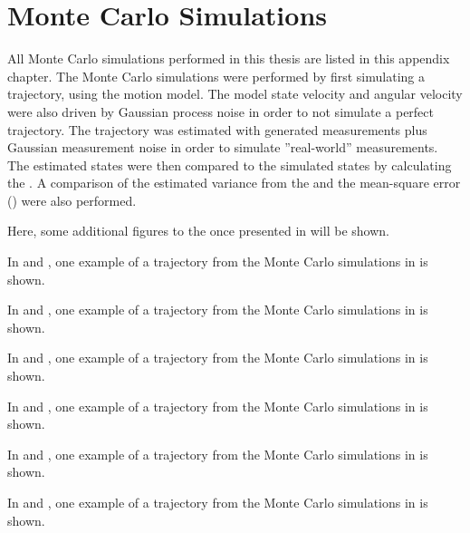 \chapter{Monte Carlo Simulations}
\label{app:montecarlo}

All Monte Carlo simulations performed in this thesis are listed in this appendix chapter.
The Monte Carlo simulations were performed by first simulating a trajectory, using the motion model.
The model state velocity and angular velocity were also driven by Gaussian process noise in order to not simulate a perfect trajectory.
The trajectory was estimated with generated measurements plus Gaussian measurement noise in order to simulate ''real-world'' measurements.
The estimated states were then compared to the simulated states by calculating the \abbrRMSE.
A comparison of the estimated variance from the \abbrEKF and the mean-square error (\abbrMSE) were also performed.

Here, some additional figures to the once presented in  will be shown.

In  and , one example of a trajectory from the Monte Carlo simulations in  is shown.

In  and , one example of a trajectory from the Monte Carlo simulations in  is shown.

In  and , one example of a trajectory from the Monte Carlo simulations in  is shown.

In  and , one example of a trajectory from the Monte Carlo simulations in  is shown.

In  and , one example of a trajectory from the Monte Carlo simulations in  is shown.

In  and , one example of a trajectory from the Monte Carlo simulations in  is shown.

